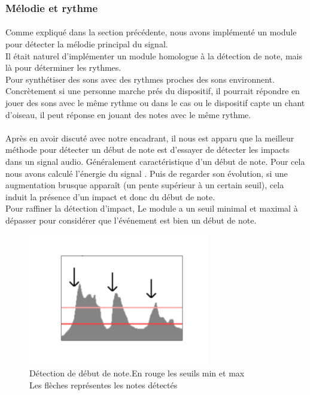 \documentclass[a4paper, titlepage, oneside, 12pt]{article}%
\begin{document}
\subsubsection{Mélodie et rythme}
\paragraph{}
Comme expliqué dans la section précédente, nous avons implémenté un module pour détecter la mélodie principal du signal.\\

Il était naturel d'implémenter un module homologue à la détection de note, mais là pour déterminer les rythmes.\\
Pour synthétiser des sons avec des rythmes proches des sons environnent.\\
Concrètement si une personne marche prés du dispositif, il pourrait répondre en jouer des sons avec le même rythme ou dans le cas ou le dispositif capte un chant d'oiseau, il peut réponse en jouant des notes avec le même rythme.\\

\paragraph{}
Après en avoir discuté avec notre encadrant, il nous est apparu que la meilleur méthode pour détecter un début de note est d’essayer de détecter les impacts dans un signal audio. Généralement caractéristique d'un début de note. Pour cela  nous avons calculé l’énergie du signal
. Puis de regarder son évolution, si une augmentation brusque apparaît (un pente supérieur à un certain seuil), cela induit la présence d'un impact et donc du début de note.\\
Pour raffiner la détection d'impact, Le module a un seuil minimal et maximal à dépasser pour considérer que l’événement est bien un début de note.
\begin{figure}[H]
	\centering
	\includegraphics[width=300px]{bonk.jpg}
	\caption{Détection de début de note.En rouge les seuils min et max\\Les flèches  représentes les notes détectés}
\end{figure}
 
\end{document}
